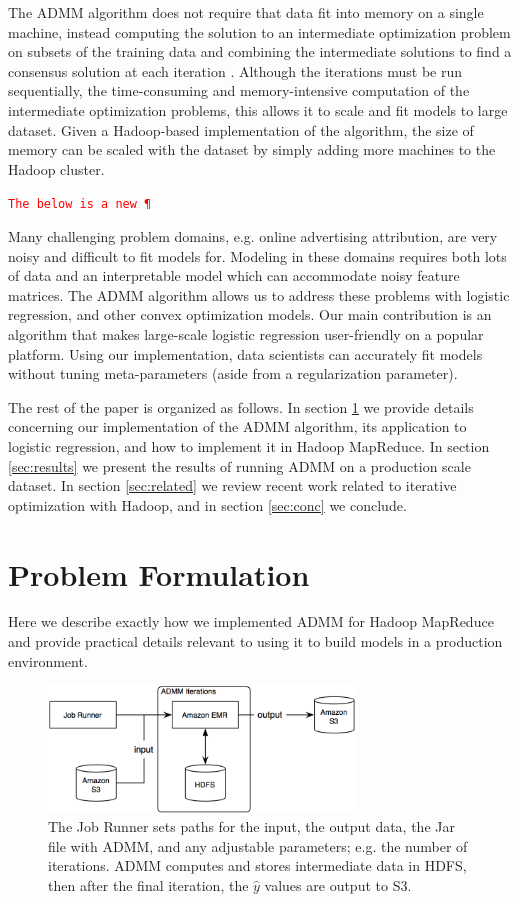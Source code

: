\documentclass[10pt, conference, compsocconf]{IEEEtran}
\newcommand{\todo}[1]{\texttt{\textcolor{red}{#1}}}
\begin{document}
The ADMM algorithm does not require that data fit into memory on a single machine, instead computing the solution to an intermediate optimization problem on subsets of the training data and combining the intermediate solutions to find a consensus solution at each iteration \cite{boyd}. Although the iterations must be run sequentially, the time-consuming and memory-intensive computation of the intermediate optimization problems, this allows it to scale and fit models to large dataset.  Given a Hadoop-based implementation of the algorithm, the size of memory can be scaled with the dataset by simply adding more machines to the Hadoop cluster.

\todo{The below is a new \P}

Many challenging problem domains, e.g. online advertising attribution, are very noisy and difficult to fit models for.  Modeling in these domains requires both lots of data and an interpretable model which can accommodate noisy feature matrices.  The ADMM algorithm allows us to address these problems with logistic regression, and other convex optimization models.  Our main contribution is an algorithm that makes large-scale logistic regression user-friendly on a popular platform.  Using our implementation, data scientists can accurately fit models without tuning meta-parameters (aside from a regularization parameter).

The rest of the paper is organized as follows.  In section \ref{sec:imp} we provide details concerning our implementation of the ADMM algorithm, its application to logistic regression, and how to implement it in Hadoop MapReduce.  In section \ref{sec:results} we present the results of running ADMM on a production scale dataset.  In section \ref{sec:related} we review recent work related to iterative optimization with Hadoop, and in section \ref{sec:conc} we conclude.

\section{Problem Formulation}\label{sec:imp}
Here we describe exactly how we implemented ADMM for Hadoop MapReduce and provide practical details relevant to using it to build models in a production environment.

\begin{figure}[!t]
\centering
\includegraphics[width=3.2in]{aws_implementation}
\caption{The Job Runner sets paths for the input, the output data, the Jar file with ADMM, and any adjustable parameters; e.g. the number of iterations.  ADMM computes and stores intermediate data in HDFS, then after the final iteration, the $\hat{y}$ values are output to S3.}
\label{fig:workflow}
\end{figure}
\end{document}
